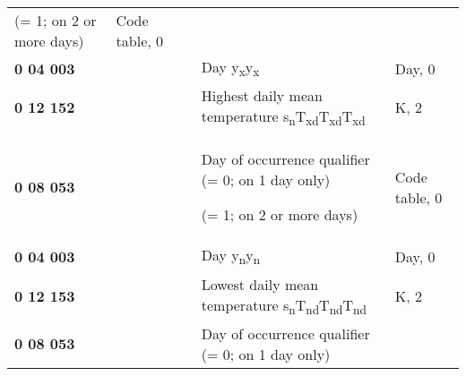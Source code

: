 \begin{longtable}[]{@{}lllll@{}}
\begin{minipage}[t]{0.17\columnwidth}
(= 1; on 2 or more days)\strut
\end{minipage} & \begin{minipage}[t]{0.17\columnwidth}\raggedright
Code table, 0\strut
\end{minipage}\tabularnewline
\textbf{0 04 003} & & & Day y\textsubscript{x}y\textsubscript{x} & Day, 0\tabularnewline
\textbf{0 12 152} & & & Highest daily mean temperature s\textsubscript{n}T\textsubscript{xd}T\textsubscript{xd}T\textsubscript{xd} & K, 2\tabularnewline
\begin{minipage}[t]{0.17\columnwidth}\raggedright
\textbf{0 08 053}\strut
\end{minipage} & \begin{minipage}[t]{0.17\columnwidth}\raggedright
\strut
\end{minipage} & \begin{minipage}[t]{0.17\columnwidth}\raggedright
\strut
\end{minipage} & \begin{minipage}[t]{0.17\columnwidth}\raggedright
Day of occurrence qualifier (= 0; on 1 day only)

(= 1; on 2 or more days)\strut
\end{minipage} & \begin{minipage}[t]{0.17\columnwidth}\raggedright
Code table, 0\strut
\end{minipage}\tabularnewline
\textbf{0 04 003} & & & Day y\textsubscript{n}y\textsubscript{n} & Day, 0\tabularnewline
\textbf{0 12 153} & & & Lowest daily mean temperature s\textsubscript{n}T\textsubscript{nd}T\textsubscript{nd}T\textsubscript{nd} & K, 2\tabularnewline
\begin{minipage}[t]{0.17\columnwidth}\raggedright
\textbf{0 08 053}\strut
\end{minipage} & \begin{minipage}[t]{0.17\columnwidth}\raggedright
\strut
\end{minipage} & \begin{minipage}[t]{0.17\columnwidth}\raggedright
\strut
\end{minipage} & \begin{minipage}[t]{0.17\columnwidth}\raggedright
Day of occurrence qualifier (= 0; on 1 day only)


\end{minipage}
\end{longtable}
